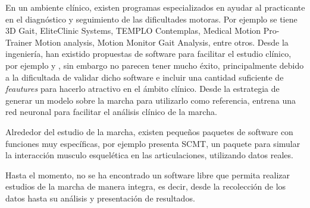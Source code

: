 En un ambiente clínico, existen programas especializados en ayudar al practicante en el diagnóstico y seguimiento de las dificultades motoras. Por ejemplo se tiene 3D Gait, EliteClinic Systems, TEMPLO Contemplas, Medical Motion Pro-Trainer Motion analysis, Motion Monitor Gait Analysis, entre otros. Desde la ingeniería, han existido propuestas de software para facilitar el estudio clínico, por ejemplo \cite{hayla} y \cite{senanayake}, sin embargo no parecen tener mucho éxito, principalmente debido a la dificultada de validar dicho software e incluir una cantidad suficiente de \emph{feautures} para hacerlo atractivo en el ámbito clínico. Desde la estrategia de generar un modelo sobre la marcha para utilizarlo como referencia, \cite{vieira} entrena una red neuronal para facilitar el análisis clínico de la marcha.

Alrededor del estudio de la marcha, existen pequeños paquetes de software con funciones muy específicas, por ejemplo \cite{eskinazi} presenta SCMT, un paquete para simular la interacción musculo esquelética en las articulaciones, utilizando datos reales.

Hasta el momento, no se ha encontrado un software libre que permita realizar estudios de la marcha de manera integra, es decir, desde la recolección de los datos hasta su análisis y presentación de resultados. 


